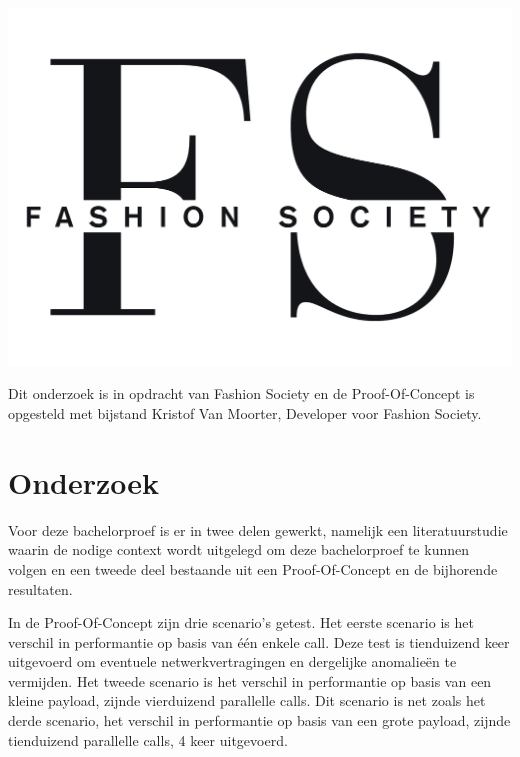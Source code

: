 \documentclass[a0,portrait]{a0poster}
\begin{document}
\begin{multicols}{2}
\begin{center}\vspace{1cm}
	\includegraphics[width=1.0\linewidth]{Fashion_society}
\end{center}\vspace{1cm}

Dit onderzoek is in opdracht van Fashion Society en de Proof-Of-Concept is opgesteld met bijstand Kristof Van Moorter, Developer voor Fashion Society.

\color{Black} %
\color{HoGentAccent1} 
\section*{Onderzoek}
\color{black}
Voor deze bachelorproef is er in twee delen gewerkt, namelijk een literatuurstudie waarin de nodige context wordt uitgelegd om deze bachelorproef te kunnen volgen en een tweede deel bestaande uit een Proof-Of-Concept en de bijhorende resultaten.

In de Proof-Of-Concept zijn drie scenario's getest. Het eerste scenario is het verschil in performantie op basis van één enkele call. Deze test is tienduizend keer uitgevoerd om eventuele netwerkvertragingen en dergelijke anomalieën te vermijden.
Het tweede scenario is het verschil in performantie op basis van een kleine payload, zijnde vierduizend parallelle calls. Dit scenario is net zoals het derde scenario, het verschil in performantie op basis van een grote payload, zijnde tienduizend parallelle calls, 4 keer uitgevoerd. 


\end{multicols}
\end{document}
